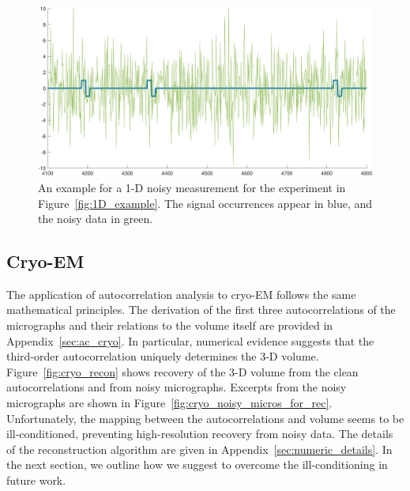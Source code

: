 \documentclass[12pt]{article}
\newcommand{\1}{\mathbf{1}}
\theoremstyle{plain}
\theoremstyle{definition}
\theoremstyle{remark}
\theoremstyle{plain}
\theoremstyle{remark}
\theoremstyle{plain}
\theoremstyle{plain}
\begin{document}
\begin{figure}[h]
	\centering
	\includegraphics[width=0.6\linewidth]{example_obs_1D}
	\caption{\label{fig:1D_obs_example} An example for a 1-D noisy measurement for the experiment in Figure~\ref{fig:1D_example}. The signal occurrences appear in blue, and the noisy data in green.
	}
\end{figure}


\subsection{Cryo-EM} The application of autocorrelation analysis to cryo-EM follows the same mathematical principles.
The derivation of the first three autocorrelations of the micrographs and their relations to the volume itself are provided in Appendix~\ref{sec:ac_cryo}.
In particular, numerical evidence suggests that the third-order autocorrelation uniquely determines the 3-D volume. 
Figure~\ref{fig:cryo_recon} shows recovery of the 3-D volume from the clean autocorrelations and from noisy micrographs. 
Excerpts from the noisy micrographs are shown in Figure~\ref{fig:cryo_noisy_micros_for_rec}.
Unfortunately, the mapping between the autocorrelations and volume seems to be ill-conditioned, preventing high-resolution recovery from noisy data.
The details of the reconstruction algorithm are given in Appendix~\ref{sec:numeric_details}.
In the next section, we outline how we suggest to overcome the ill-conditioning in future work. 
\end{document}
